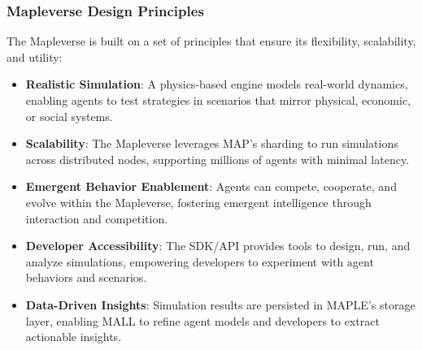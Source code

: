 \documentclass[a4paper,11pt]{article}
\begin{document}
\subsubsection{Mapleverse Design Principles}
The Mapleverse is built on a set of principles that ensure its flexibility, scalability, and utility:
\begin{itemize}[leftmargin=*]
    \item \textbf{Realistic Simulation}: A physics-based engine models real-world dynamics, enabling agents to test strategies in scenarios that mirror physical, economic, or social systems.
    \item \textbf{Scalability}: The Mapleverse leverages MAP’s sharding to run simulations across distributed nodes, supporting millions of agents with minimal latency.
    \item \textbf{Emergent Behavior Enablement}: Agents can compete, cooperate, and evolve within the Mapleverse, fostering emergent intelligence through interaction and competition.
    \item \textbf{Developer Accessibility}: The SDK/API provides tools to design, run, and analyze simulations, empowering developers to experiment with agent behaviors and scenarios.
    \item \textbf{Data-Driven Insights}: Simulation results are persisted in MAPLE’s storage layer, enabling MALL to refine agent models and developers to extract actionable insights.
\end{itemize}
\end{document}
